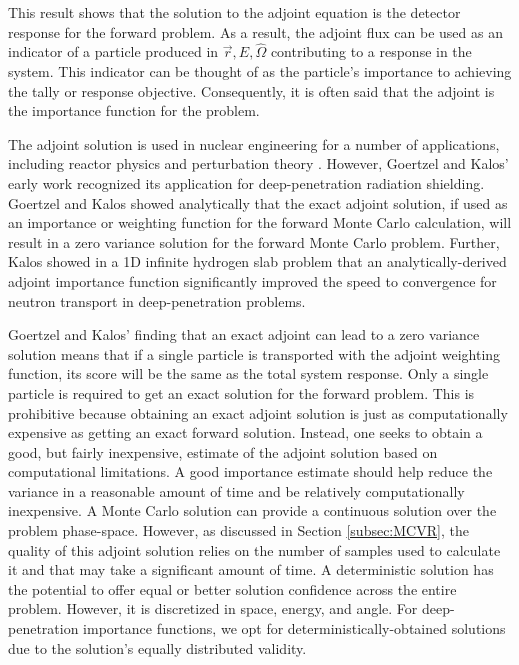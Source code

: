 This result shows that the solution to the adjoint equation is the detector
response for the forward problem. As a result, the adjoint flux can be used as
an indicator of a particle produced in $\vec{r}, E, \hat{\Omega}$ contributing
to a response in the system. This indicator can be thought of as the particle's
importance to achieving the tally or response objective. Consequently, it is
often said that the adjoint is the importance function for the problem.

The adjoint solution is used in nuclear engineering for a number of
applications, including reactor physics and perturbation theory
\cite{lewins_importance_1965, lewins_developments_1968,
greenspan_developments_1976, lux_monte_1991}.
However, Goertzel and Kalos' early work recognized its
application for deep-penetration radiation shielding.
Goertzel and Kalos \cite{goertzel_monte_1958}
showed analytically
that the exact adjoint solution, if used as an importance or weighting
function for the forward Monte Carlo calculation, will result in a zero variance
solution for the forward Monte Carlo problem. Further, Kalos
\cite{kalos_importance_1963} showed in a 1D infinite hydrogen slab problem that
an analytically-derived adjoint importance function significantly improved the
speed to convergence for neutron
transport in deep-penetration problems.

Goertzel and Kalos' finding that an exact adjoint can lead to a zero variance
solution means that if a single particle is transported with the adjoint
weighting function, its score will be the same as the total system response.
Only a single particle is required to get an exact solution for the forward
problem. This is prohibitive because obtaining
an exact adjoint solution is just as computationally expensive as getting
an exact forward solution. Instead, one seeks to obtain a good, but fairly
inexpensive, estimate of the
adjoint solution based on computational limitations. A good importance estimate
should help reduce the variance in a reasonable amount of time and be
relatively computationally inexpensive. A Monte Carlo solution can
provide a continuous solution over the problem phase-space. However, as
discussed in Section \ref{subsec:MCVR}, the quality of this adjoint solution
relies on the number of samples used to calculate it and that may take a
significant amount of time. A deterministic solution
has the potential to offer equal or better solution confidence across the
entire problem. However, it is discretized in space, energy, and angle.
For deep-penetration importance functions, we
opt for deterministically-obtained solutions due to the solution's equally
distributed validity.


